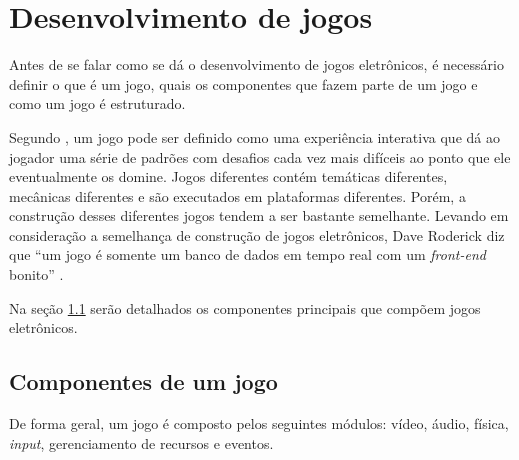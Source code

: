 \section{Desenvolvimento de jogos} \label{devjog}

Antes de se falar como se dá o desenvolvimento de jogos eletrônicos, é necessário definir o que é um jogo, quais os componentes que fazem parte de um jogo e como um jogo é estruturado.

Segundo , um jogo pode ser definido como uma experiência interativa que dá ao jogador uma série de padrões com desafios cada vez mais difíceis ao ponto que ele eventualmente os domine. Jogos diferentes contém temáticas diferentes, mecânicas diferentes e são executados em plataformas diferentes. Porém, a construção desses diferentes jogos tendem a ser bastante semelhante. Levando em consideração a semelhança de construção de jogos eletrônicos, Dave Roderick diz que ``um jogo é somente um banco de dados em tempo real com um \textit{front-end} bonito'' \cite{rollings2004game}.

Na seção \ref{componentes} serão detalhados os componentes principais que compõem jogos eletrônicos.

\subsection{Componentes de um jogo} \label{componentes}

De forma geral, um jogo é composto pelos seguintes módulos: vídeo, áudio, física, \textit{input}, gerenciamento de recursos e eventos.

